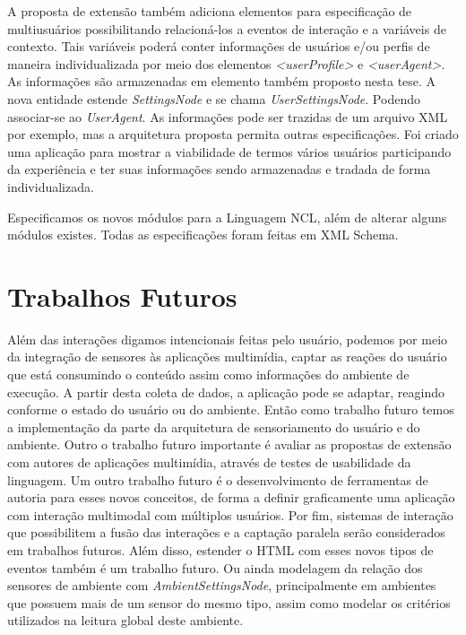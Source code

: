 A proposta de extensão também adiciona elementos para especificação de multiusuários possibilitando relacioná-los a eventos de interação e a variáveis de contexto. Tais variáveis poderá conter informações de usuários e/ou perfis de maneira individualizada por meio dos elementos  \textit{<userProfile>} e \textit{<userAgent>}. As informações são armazenadas em elemento também proposto nesta tese. A nova entidade estende \textit{SettingsNode} e se chama \textit{UserSettingsNode}. Podendo associar-se ao \textit{UserAgent}. As informações pode ser trazidas de um arquivo XML por exemplo, mas a arquitetura proposta permita outras especificações. Foi criado uma aplicação para mostrar a viabilidade de termos vários usuários participando da experiência e ter suas informações sendo armazenadas e tradada de forma individualizada. 

Especificamos os novos módulos para a Linguagem NCL, além de alterar alguns módulos existes. Todas as especificações foram feitas em XML Schema.

\section{Trabalhos Futuros}
\label{sec:trabFuturo}

Além das interações digamos intencionais feitas pelo usuário, podemos por meio da integração de sensores às aplicações multimídia, captar as reações do usuário que está consumindo o conteúdo assim como informações do ambiente de execução. A partir desta coleta de dados, a aplicação pode se adaptar, reagindo conforme o estado do usuário ou do ambiente. Então como trabalho futuro temos a implementação da parte da arquitetura de sensoriamento do usuário e do ambiente. Outro o trabalho futuro importante é avaliar as propostas de extensão com autores de aplicações multimídia, através de testes de usabilidade da linguagem. Um outro trabalho futuro é o desenvolvimento de ferramentas de autoria para esses novos conceitos, de forma a definir graficamente uma aplicação com interação multimodal com múltiplos usuários. Por fim, sistemas de interação que possibilitem a fusão das interações e a captação paralela serão considerados em trabalhos futuros. Além disso, estender o HTML com esses novos tipos de eventos também é um trabalho futuro. Ou ainda modelagem da relação dos sensores de ambiente com \textit{AmbientSettingsNode}, principalmente em ambientes que possuem mais de um sensor do mesmo tipo, assim como  modelar os critérios utilizados na leitura global deste ambiente.



